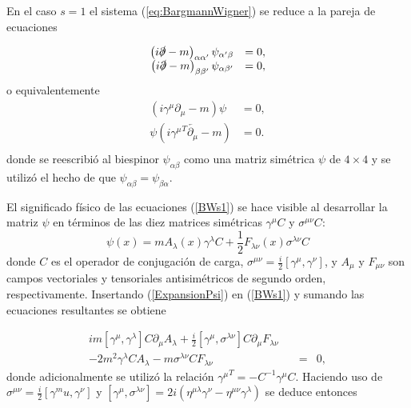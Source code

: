 En el caso $s=1$ el sistema (\ref{eq:BargmannWigner}) se reduce a la pareja de ecuaciones

\begin{equation}
\begin{array}{rl}
\left(i\slashed{\partial}-m \right)_{\alpha \alpha'}\psi_{\alpha' \beta}&=0,\\
\left(i\slashed{\partial}-m \right)_{\beta \beta'}\psi_{\alpha \beta'}&=0,\\
\end{array}
\end{equation}
o equivalentemente
\begin{equation}\label{BWs1}
\begin{array}{rl}
\left(i\gamma^\mu \partial_\mu -m\right)\psi &=0,\\[5pt]
\psi(i{\gamma^\mu}^{T} \overleftarrow{\partial_\mu} -m) &=0.\\
\end{array}
\end{equation}
donde se reescribió al biespinor $\psi_{\alpha \beta}$ como una matriz simétrica $\psi$ de $4 \times 4$ y se utilizó el hecho de que $\psi_{\alpha\beta}=\psi_{\beta\alpha}$.

El significado físico de las ecuaciones (\ref{BWs1}) se hace visible al desarrollar la matriz $\psi$ en términos de las diez matrices simétricas $\gamma^\mu C$ y $\sigma^{\mu \nu} C$:
\begin{equation}\label{ExpansionPsi}
\psi(x)=mA_\lambda(x) \gamma^\lambda C+\frac{1}{2}F_{\lambda \nu}(x)\sigma^{\lambda \nu} C
\end{equation}
donde $C$ es el operador de conjugación de carga, $\sigma^{\mu \nu}=\frac{i}{2}\left[\gamma^{\mu},\gamma^{\nu} \right]$, y $A_\mu$ y $F_{\mu \nu}$ son campos vectoriales y tensoriales antisimétricos de segundo orden, respectivamente. Insertando (\ref{ExpansionPsi}) en (\ref{BWs1}) y sumando las ecuaciones resultantes se obtiene

\begin{equation}\label{}
\begin{array}{rcl}
im\left[\gamma^\mu, \gamma^\lambda \right]C \partial_\mu A_\lambda + \frac{i}{2}\left[\gamma^\mu, \sigma^{\lambda\nu}\right]C\partial_\mu F_{\lambda \nu}\quad & & \\[5pt]
-2m^2 \gamma^\lambda C A_\lambda -m \sigma^{\lambda\nu}CF_{\lambda \nu} & = & 0,
\end{array}
\end{equation}
donde adicionalmente se utilizó la relación ${\gamma^\mu}^{T}=-C^{-1}\gamma^\mu C$. Haciendo uso de $\sigma^{\mu\nu}=\frac{i}{2}\left[ \gamma^mu, \gamma^\nu \right]$ y $\left[\gamma^\mu,\sigma^{\lambda \nu}\right]=2i(\eta^{\mu\lambda}\gamma^\nu-\eta^{\mu\nu}\gamma^\lambda)$ se deduce entonces

